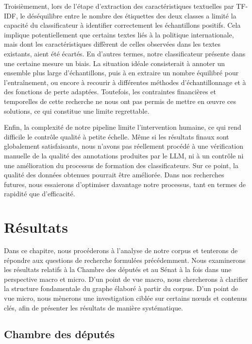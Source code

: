 \documentclass[a4paper,twoside,12pt]{book}
\begin{document}
Troisièmement, lors de l'étape d'extraction des caractéristiques textuelles par TF-IDF, le déséquilibre entre le nombre des étiquettes des deux classes a limité la capacité du classificateur à identifier correctement les échantillons positifs. Cela implique potentiellement que certains textes liés à la politique internationale, mais dont les caractéristiques diffèrent de celles observées dans les textes existants, aient été écartés. En d'autres termes, notre classificateur présente dans une certaine mesure un biais. La situation idéale consisterait à annoter un ensemble plus large d'échantillons, puis à en extraire un nombre équilibré pour l'entraînement, ou encore à recourir à différentes méthodes d'échantillonnage et à des fonctions de perte adaptées. Toutefois, les contraintes financières et temporelles de cette recherche ne nous ont pas permis de mettre en œuvre ces solutions, ce qui constitue une limite regrettable.

Enfin, la complexité de notre pipeline limite l'intervention humaine, ce qui rend difficile le contrôle qualité à petite échelle. Même si les résultats finaux sont globalement satisfaisants, nous n'avons pas réellement procédé à une vérification manuelle de la qualité des annotations produites par le LLM, ni à un contrôle ni une amélioration du processus de formation des classificateurs. Sur ce point, la qualité des données obtenues pourrait être améliorée. Dans nos recherches futures, nous essaierons d'optimiser davantage notre processus, tant en termes de rapidité que d'efficacité.

\chapter{Résultats}

Dans ce chapitre, nous procéderons à l'analyse de notre corpus et tenterons de répondre aux questions de recherche formulées précédemment. Nous examinerons les résultats relatifs à la Chambre des députés et au Sénat à la fois dans une perspective macro et micro. D'un point de vue macro, nous chercherons à clarifier la structure fondamentale du graphe élaboré à partir du corpus. D'un point de vue micro, nous mènerons une investigation ciblée sur certains nœuds et contenus clés, afin de présenter les résultats de manière systématique.



\section{Chambre des députés}
\end{document}
